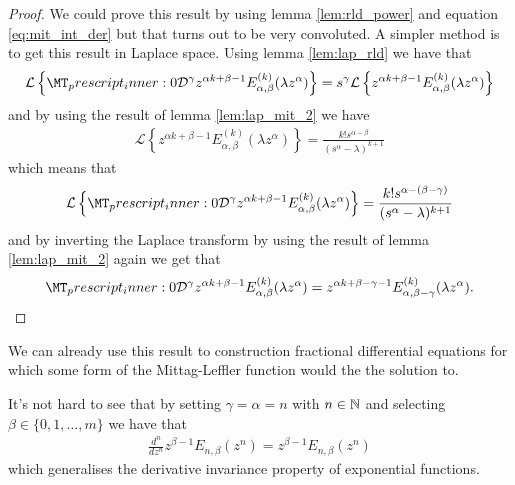 \begin{proof}
    We could prove this result by using lemma \ref{lem:rld_power} and equation \eqref{eq:mit_int_der} but that turns out to be very convoluted. A simpler method is to get this result in Laplace space.
    Using lemma \ref{lem:lap_rld} we have that 
    \begin{align*}
        \mathcal{L}\left\{ \prescript{}{0}{\mathcal{D}}^\gamma z^{\alpha k+\beta-1}E_{\alpha,\beta}^{(k)}(\lambda z^\alpha) \right\} = s^\gamma \mathcal{L}\left\{z^{\alpha k+\beta-1}E_{\alpha,\beta}^{(k)}(\lambda z^\alpha) \right\}
    \end{align*}
    and by using the result of lemma \ref{lem:lap_mit_2} we have
    \begin{align*}
        \mathcal{L}\left\{z^{\alpha k+\beta-1}E_{\alpha,\beta}^{(k)}(\lambda z^\alpha) \right\} = \frac{k!s^{\alpha - \beta}}{(s^\alpha - \lambda)^{k+1}}
    \end{align*}
    which means that
    \begin{align*}
        \mathcal{L}\left\{ \prescript{}{0}{\mathcal{D}}^\gamma z^{\alpha k+\beta-1}E_{\alpha,\beta}^{(k)}(\lambda z^\alpha) \right\} = \frac{k!s^{\alpha - (\beta - \gamma)}}{(s^\alpha - \lambda)^{k+1}}
    \end{align*}
    and by inverting the Laplace transform by using the result of lemma \ref{lem:lap_mit_2} again we get that
    \begin{align*}
        \prescript{}{0}{\mathcal{D}}^\gamma z^{\alpha k+\beta-1}E_{\alpha,\beta}^{(k)}(\lambda z^\alpha) = z^{\alpha k + \beta - \gamma - 1 } E_{\alpha,\beta-\gamma}^{(k)}(\lambda z^\alpha).
    \end{align*}
\end{proof}
We can already use this result to construction fractional differential equations for which some form of the Mittag-Leffler function would the the solution to. 

It's not hard to see that by setting $ \gamma = \alpha = n $ with $ n \in \mathbb{N} $ and selecting $ \beta \in \{ 0 , 1, \ldots, m\} $ we have that
\begin{align*}
    \frac{d^n}{dz^n} z^{\beta - 1} E_{n,\beta}(z^n) = z^{\beta - 1}E_{n,\beta}(z^n)
\end{align*}
which generalises the derivative invariance property of exponential functions.

